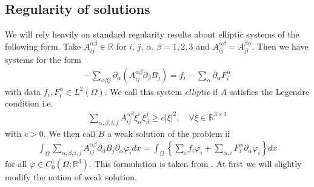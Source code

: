 \documentclass[12pt,a4paper]{article}
\numberwithin{equation}{subsection}
\numberwithin{lemma}{subsection}
\theoremstyle{definition}
\newcommand{\real}{\mathbb{R}}
\begin{document}
\subsection{Regularity of solutions}

We will rely heavily on standard regularity results about elliptic systems 
of the following form. Take $A_{ij}^{\alpha \beta} \in \real$
for $i$, $j$, $\alpha$, $\beta = 1,2,3$ and 
$A_{ij}^{\alpha \beta} = A_{ji}^{\beta \alpha}$. Then we have systems for the 
form 
\begin{align*}
    -\sum\limits_{\alpha \beta j} \partial_\alpha 
        (A_{ij}^{\alpha \beta} \partial_\beta B_j)
    = f_i - \sum\limits_\alpha \partial_\alpha F_i^\alpha
\end{align*}
with data $f_i, F_i^\alpha \in L^2(\Omega)$. We call this system 
\textit{elliptic} if $A$ satisfies the Legendre condition i.e.
\begin{align}
    \sum_{\alpha,\beta,i,j}A_{ij}^{\alpha \beta} \xi_\alpha^i \xi_\beta^j
    \geq c |\xi|^2, \quad \forall \xi \in \real^{3 \times 3} 
    \label{eq:legendre_condition}
\end{align}
with $c > 0$.
We then call $B$ a weak solution
of the problem if 
\begin{align}
    \int_\Omega \sum\limits_{\alpha,\beta,i,j} 
        A_{ij}^{\alpha \beta} \partial_\beta B_j \partial_\alpha \varphi_i dx
    = \int_\Omega \left\{ \sum\limits_i f_i \varphi_i + 
        \sum\limits_{\alpha,i} F_i^\alpha \partial_\alpha \varphi_i \right\} dx
    \label{eq:weak_elliptic_system}
\end{align}
for all $\varphi \in C^1_0(\Omega;\real^3)$. This formulation is taken from 
\cite[Sec. 1.3]{Lectures on PDE}. At first we will slightly modify
the notion of weak solution. 
\end{document}
